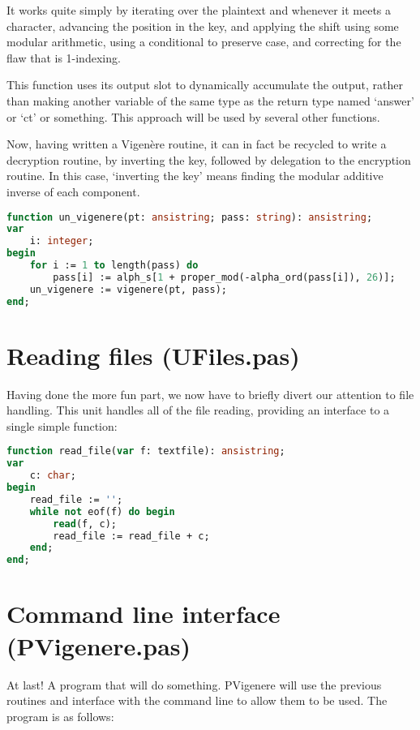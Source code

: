 \documentclass{article}
\begin{document}
    It works quite simply by iterating over the plaintext and whenever it meets
    a character, advancing the position in the key, and applying the shift
    using some modular arithmetic, using a conditional to preserve case, and
    correcting for the flaw that is 1-indexing.

    This function uses its output slot to dynamically accumulate the output,
    rather than making another variable of the same type as the return type
    named `answer' or `ct' or something. This approach will be used by several
    other functions.

    Now, having written a Vigen\`ere routine, it can in fact be recycled to
    write a decryption routine, by inverting the key, followed by delegation to
    the encryption routine. In this case, `inverting the key' means finding the
    modular additive inverse of each component.

\begin{lstlisting}[language=Pascal, caption=Vigen\`ere decryption]
function un_vigenere(pt: ansistring; pass: string): ansistring;
var
    i: integer;
begin
    for i := 1 to length(pass) do
        pass[i] := alph_s[1 + proper_mod(-alpha_ord(pass[i]), 26)];
    un_vigenere := vigenere(pt, pass);
end;
\end{lstlisting}

    \section{Reading files (UFiles.pas)}
    Having done the more fun part, we now have to briefly divert our attention
    to file handling. This unit handles all of the file reading, providing an
    interface to a single simple function:

\begin{lstlisting}[language=Pascal, caption=File-reading routine]
function read_file(var f: textfile): ansistring;
var
    c: char;
begin
    read_file := '';
    while not eof(f) do begin
        read(f, c);
        read_file := read_file + c;
    end;
end;
\end{lstlisting}

    \section{Command line interface (PVigenere.pas)}
    At last! A program that will do something. PVigenere will use the previous
    routines and interface with the command line to allow them to be used. The
    program is as follows:
\end{document}
